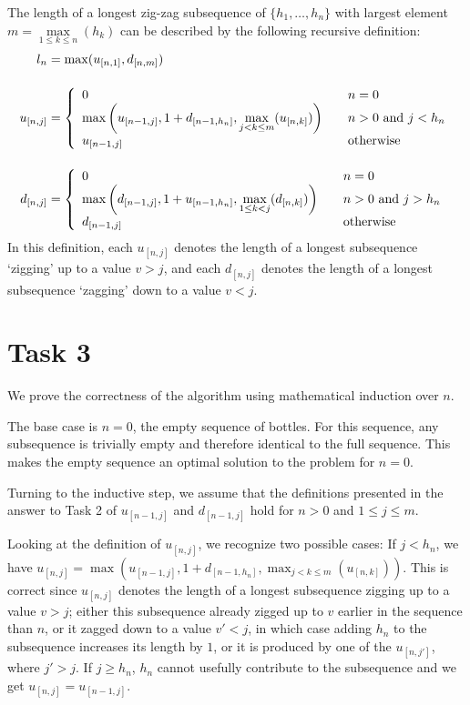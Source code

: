 \documentclass[paper=a4, fleqn]{article}
\begin{document}
The length of a longest zig-zag subsequence of $\{h_1,\ldots,h_n\}$ with largest
element $m=\max\limits_{1\leq k\leq n}(h_k)$ can be described by the following
recursive definition:
\begin{align*}
  l_n &= \max(u_{[n,1]}, d_{[n,m]})\\[12pt]
u_{[n, j]} &= \left\{
  \begin{array}{l l}
    0& \quad \text{$n=0$}\\
    \max\left(u_{[n-1,j]}, 1+d_{[n-1,h_n]}, \max\limits_{j<k\leq
        m}(u_{[n,k]})\right)&
    \quad\text{$n>0$ and $j<h_n$}\\
    u_{[n-1,j]}& \quad\text{otherwise}
  \end{array} \right.\\[12pt]
d_{[n, j]} &= \left\{
  \begin{array}{l l}
    0& \quad \text{$n=0$}\\
    \max\left(d_{[n-1,j]}, 1+u_{[n-1,h_n]}, \max\limits_{1\leq
        k<j}(d_{[n,k]})\right)&
    \quad\text{$n>0$ and $j>h_n$}\\
    d_{[n-1,j]}& \quad\text{otherwise}
  \end{array} \right.
\end{align*}
In this definition, each $u_{[n,j]}$ denotes the length of a longest subsequence
`zigging' up to a value $v>j$, and each $d_{[n,j]}$ denotes the
length of a longest subsequence `zagging' down to a value $v<j$.

\section*{Task 3}

We prove the correctness of the algorithm using mathematical induction over $n$.

The base case is $n=0$, the empty sequence of bottles. For this sequence, any
subsequence is trivially empty and therefore identical to the full
sequence. This makes the empty sequence an optimal solution to the problem for
$n=0$.

Turning to the inductive step, we assume that the definitions presented in the
answer to Task 2 of $u_{[n-1, j]}$ and $d_{[n-1, j]}$ hold for $n>0$ and $1\leq
j\leq m$.

Looking at the definition of $u_{[n, j]}$, we recognize two possible cases: If
$j<h_n$, we have $u_{[n, j]}=\max(u_{[n-1,j]}, 1+d_{[n-1,h_n]}, \max_{j<k\leq
  m}(u_{[n,k]}))$. This is correct since $u_{[n, j]}$ denotes the length of a
longest subsequence zigging up to a value $v>j$; either this subsequence already
zigged up to $v$ earlier in the sequence than $n$, or it zagged down to a value
$v'<j$, in which case adding $h_n$ to the subsequence increases its length by
$1$, or it is produced by one of the $u_{[n, j']}$, where $j'>j$. If $j\geq
h_n$, $h_n$ cannot usefully contribute to the subsequence and we get $u_{[n,
  j]}=u_{[n-1, j]}$.
\end{document}

